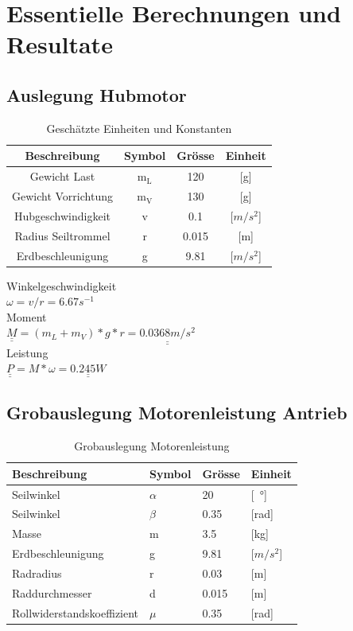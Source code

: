 \documentclass[a4paper]{report}
\begin{document}
\section{Essentielle Berechnungen und Resultate}
\label{sec:EssBerechnung}
\subsection{Auslegung Hubmotor}
\begin{table}[h!]
	\centering
	\begin{tabular}{|c|c|c|c|}
		\hline
		\textbf{Beschreibung}& \textbf{Symbol} & \textbf{Grösse} & \textbf{Einheit} \\
		\hline
		Gewicht Last& m$_{\text{L}}$ & 120 & [g] \\
		\hline
		Gewicht Vorrichtung& m$_{\text{V}}$ & 130 & [g] \\
		\hline
		Hubgeschwindigkeit& v & 0.1 & [$m/s^2$] \\
		\hline
		Radius Seiltrommel & r & 0.015 & [m]\\
		\hline
		Erdbeschleunigung & g & 9.81 & [$m/s^2$]\\
		\hline
	\end{tabular}
	\caption{Geschätzte Einheiten und Konstanten}
\end{table}
\noindent
Winkelgeschwindigkeit\\
$\omega=v/r=6.67s^{-1}$	\\
Moment\\
$\underline{\underline{M}}=(m_L+m_V)*g*r=\underline{\underline{0.0368m/s^2}}$\\
Leistung	\\
$\underline{\underline{P}}=M*\omega=\underline{\underline{0.245W}}$

\subsection{Grobauslegung Motorenleistung Antrieb}
\label{ssec:GrobMotor}
\begin{table}[h!]
	\begin{tabular}{|p{}|p{}|p{}|p{}|}
		\hline
		\textbf{Beschreibung} & \textbf{Symbol} & \textbf{Grösse}& \textbf{Einheit}  \\
		\hline
		Seilwinkel & $\alpha$ & 20 & [\SI{}{\degree}] \\
		\hline
		Seilwinkel & $\beta$ & 0.35 & [rad] \\
		\hline
		Masse & m & 3.5 & [kg] \\
		\hline
		Erdbeschleunigung & g & 9.81 & [$m/s^2$] \\
		\hline
		Radradius & r & 0.03 & [m] \\
		\hline
		Raddurchmesser & d & 0.015 & [m] \\
		\hline
		Rollwiderstandskoeffizient & $\mu$ & 0.35 & [rad] \\
		\hline
	\end{tabular}
	\caption{Grobauslegung Motorenleistung}
	\label{tbl:Motorenleistung}
\end{table}
\end{document}
